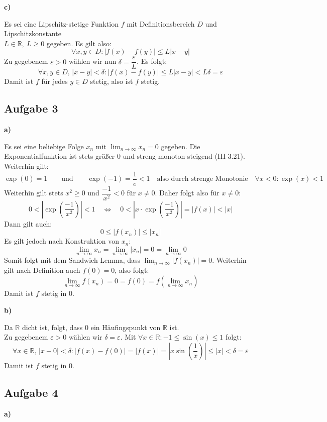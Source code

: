 \documentclass[a4paper,graphics,11pt]{article}
\newcommand{\aufgabe}[1]{\subsection*{Aufgabe #1}}
\begin{document}
\textbf{c)}

Es sei eine Lipschitz-stetige Funktion $f$ mit Definitionsbereich $D$ und Lipschitzkonstante\\
$L \in \mathbb{R},\ L \geq 0$ gegeben. Es gilt also:
$$
    \forall x,y \in D\colon
    |f(x)-f(y)| \leq L|x-y|
$$
Zu gegebenem $\varepsilon > 0$ wählen wir nun $\delta = \dfrac{\varepsilon}{L}$. Es folgt:
$$
    \forall x,y \in D,\,|x-y| < \delta \colon
    |f(x)-f(y)| \leq L|x-y| < L \delta = \varepsilon
$$
Damit ist $f$ für jedes $y \in D$ stetig, also ist $f$ stetig.


\aufgabe{3}
\textbf{a)}

Es sei eine beliebige Folge $x_n$ mit $\lim_{n \to \infty}\limits x_n = 0$ gegeben.
Die Exponentialfunktion ist stets größer 0 und streng monoton steigend (III 3.21).
Weiterhin gilt:
$$
    \exp(0) = 1
    \qquad\text{und}\qquad
    \exp(-1) = \frac{1}{e} < 1
    \quad\text{also durch strenge Monotonie}\quad
    \forall x < 0 \colon \exp(x) < 1
$$
Weiterhin gilt stets $x^2 \geq 0$ und $\dfrac{-1}{x^2} < 0$ für $x\neq 0$.
Daher folgt also für $x \neq 0\colon$
$$
    0 < \left|\exp\left(\frac{-1}{x^2}\right)\right| < 1
    \quad \Longleftrightarrow\quad
    0 < \left|x\cdot\exp\left(\frac{-1}{x^2}\right)\right| = |f(x)| < |x|
$$
Dann gilt auch:
$$
    0 \leq |f(x_n)| \leq |x_n|
$$
Es gilt jedoch nach Konstruktion von $x_n\colon$
$$
    \lim_{n \to \infty}\limits x_n
    = \lim_{n \to \infty}\limits |x_n|
    = 0
    = \lim_{n \to \infty}\limits 0
$$
Somit folgt mit dem Sandwich Lemma, dass $\lim_{n \to \infty}\limits |f(x_n)| = 0$.
Weiterhin gilt nach Definition auch $f(0) = 0$, also folgt:
$$
    \lim_{n \to \infty} f(x_n) = 0 = f(0) = f\left(\lim_{n \to \infty} x_n\right)
$$
Damit ist $f$ stetig in 0.

\textbf{b)}

Da $\mathbb{R}$ dicht ist, folgt, dass 0 ein Häufingspunkt von $\mathbb{R}$ ist.\\
Zu gegebenem $\varepsilon > 0$ wählen wir $\delta = \varepsilon$.
Mit $\forall x \in \mathbb{R}\colon -1 \leq \sin(x) \leq 1$ folgt:
$$
    \forall x \in \mathbb{R},\, |x-0| < \delta\colon
    |f(x) - f(0)| = |f(x)| = \left|x \sin\left(\frac{1}{x}\right)\right|
    \leq |x| < \delta = \varepsilon
$$
Damit ist $f$ stetig in 0.

\newpage

\aufgabe{4}
\textbf{a)}
\end{document}
